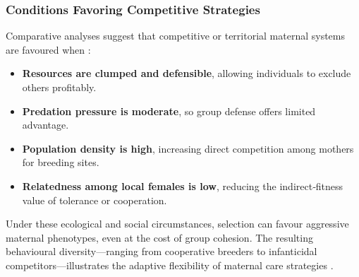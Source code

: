         \subsubsection{Conditions Favoring Competitive Strategies}
        Comparative analyses suggest that competitive or territorial maternal systems are favoured when \cite{emlen1977, lukas2018}:
        \begin{itemize}
            \item \textbf{Resources are clumped and defensible}, allowing individuals to exclude others profitably.
            \item \textbf{Predation pressure is moderate}, so group defense offers limited advantage.
            \item \textbf{Population density is high}, increasing direct competition among mothers for breeding sites.
            \item \textbf{Relatedness among local females is low}, reducing the indirect‐fitness value of tolerance or cooperation.
        \end{itemize}
        Under these ecological and social circumstances, selection can favour aggressive maternal phenotypes, even at the cost of group cohesion.  The resulting behavioural diversity—ranging from cooperative breeders to infanticidal competitors—illustrates the adaptive flexibility of maternal care strategies \cite{stockley2011}.

        
